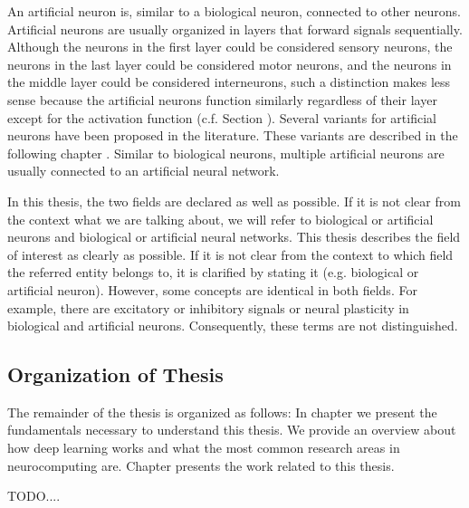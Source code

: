 An artificial neuron is, similar to a biological neuron, connected to other neurons.
Artificial neurons are usually organized in layers that forward signals sequentially.
Although the neurons in the first layer could be considered sensory neurons, the neurons in the last layer could be considered motor neurons, and the neurons in the middle layer could be considered interneurons, such a distinction makes less sense because the artificial neurons function similarly regardless of their layer except for the activation function (c.f. Section ).
Several variants for artificial neurons have been proposed in the literature. These variants are described in the following chapter .
Similar to biological neurons, multiple artificial neurons are usually connected to an artificial neural network.

In this thesis, the two fields are declared as well as possible.
If it is not clear from the context what we are talking about, we will refer to biological or artificial neurons and biological or artificial neural networks.
This thesis describes the field of interest as clearly as possible.
If it is not clear from the context to which field the referred entity belongs to, it is clarified by stating it (e.g. biological or artificial neuron).
However, some concepts are identical in both fields.
For example, there are excitatory or inhibitory signals or neural plasticity in biological and artificial neurons.
Consequently, these terms are not distinguished.

\subsection{Organization of Thesis}
The remainder of the thesis is organized as follows: In chapter  we present the fundamentals necessary to understand this thesis. We provide an overview about how deep learning works and what the most common research areas in neurocomputing are. Chapter  presents the work related to this thesis.

TODO....



